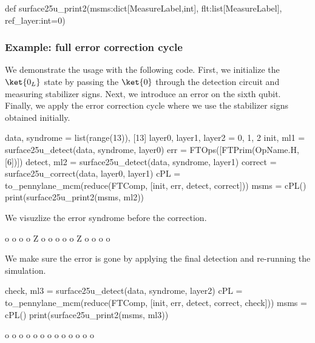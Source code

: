   \begin{python}
  def surface25u_print2(msms:dict[MeasureLabel,int], flt:list[MeasureLabel], ref_layer:int=0)
  \end{python}

\le

\subsubsection{Example: full error correction cycle}

We demonstrate the usage with the following code. First, we initialize the $\ket{0_L}$ state by
passing the $\ket{0}$ through the detection circuit and measuring stabilizer signs. Next, we
introduce an error on the sixth qubit. Finally, we apply the error correction cycle where we use the
stabilizer signs obtained initially.

  \begin{python}
  data, syndrome = list(range(13)), [13]
  layer0, layer1, layer2 = 0, 1, 2
  init, ml1 = surface25u_detect(data, syndrome, layer0)
  err = FTOps([FTPrim(OpName.H,[6])])
  detect, ml2 = surface25u_detect(data, syndrome, layer1)
  correct = surface25u_correct(data, layer0, layer1)
  cPL = to_pennylane_mcm(reduce(FTComp, [init, err, detect, correct]))
  msms = cPL()
  print(surface25u_print2(msms, ml2))
  \end{python}

We visuzlize the error syndrome before the correction.

  \begin{result}

  o   o   o
    o Z o 
  o   o   o
    o Z o 
  o   o   o

  \end{result}

We make sure the error is gone by applying the final detection and re-running the simulation.

  \begin{python}
  check, ml3 = surface25u_detect(data, syndrome, layer2)
  cPL = to_pennylane_mcm(reduce(FTComp, [init, err, detect, correct, check]))
  msms = cPL()
  print(surface25u_print2(msms, ml3))
  \end{python}

  \begin{result}

  o   o   o
    o   o 
  o   o   o
    o   o 
  o   o   o

  \end{result}

